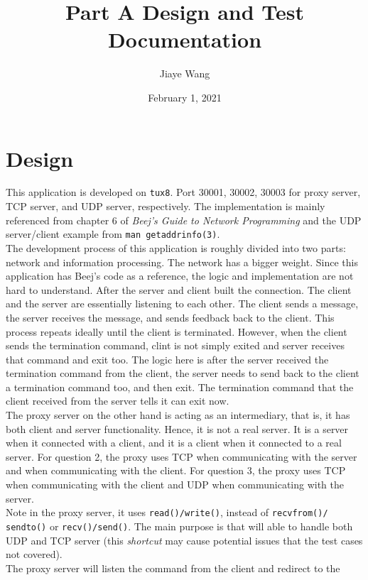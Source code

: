 \documentclass[12pt]{article}
\title{Part A Design and Test Documentation}
\author{Jiaye Wang}
\date{February 1, 2021 }
\begin{document}
\maketitle
\section*{Design}
This application is developed on \texttt{tux8}. Port 30001, 30002, 30003 for 
proxy server, TCP server, and UDP server, respectively. The implementation is 
mainly referenced from chapter 6 of \textit{Beej's Guide to Network Programming} 
and the UDP server/client example from \texttt{man getaddrinfo(3)}.
\\[0.5cm]
The development process of this application is roughly divided into two parts: 
network and information processing. The network has a bigger weight. Since 
this application has Beej's code as a reference, the logic and implementation 
are not hard to understand. After the server and client built the connection. 
The client and the server are essentially listening to each other. The client 
sends a message, the server receives the message, and sends feedback back to 
the client. This process repeats ideally until the client is terminated. However, 
when the client sends the termination command, clint is not simply exited and 
server receives that command and exit too. The logic here is after the server 
received the termination command from the client, the server needs to send back to 
the client a termination command too, and then exit. The termination command that 
the client received from the server tells it can exit now.  
\\[0.5cm]
The proxy server on the other hand is acting as an intermediary, that is, it 
has both client and server functionality. Hence, it is not a real server. It is 
a server when it connected with a client, and it is a client when it connected 
to a real server. For question 2, the proxy uses TCP when communicating with the
server and when communicating with the client. For question 3, the proxy uses TCP
when communicating with the client and UDP when communicating with the server. 
\\[0.5cm]
Note in the proxy server, it uses \texttt{read()/write()},
instead of \texttt{recvfrom()/} \texttt{sendto()} or \texttt{recv()/}\texttt{send()}. The main 
purpose is that will able to handle both UDP and TCP server (this \textit{shortcut} may
cause potential issues that the test cases not covered). 
\\[0.5cm]
The proxy server will listen the command from the client and redirect to the 
\end{document}
